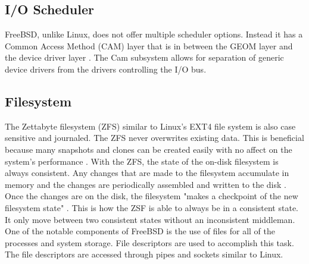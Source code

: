 \subsection{I/O Scheduler}
FreeBSD, unlike Linux, does not offer multiple scheduler options. Instead it has a Common Access Method (CAM) layer that is in between the GEOM layer and the device driver layer \cite{Freebsdtext}. The Cam subsystem allows for separation of generic device drivers from the drivers controlling the I/O bus.

\subsection{Filesystem}
The Zettabyte filesystem (ZFS) similar to Linux's EXT4 file system is also case sensitive and journaled. The ZFS never overwrites existing data. This is beneficial because many snapshots and clones can be created easily with no affect on the system's performance \cite{Freebsdtext}. With the ZFS, the state of the on-disk filesystem is always consistent. Any changes that are made to the filesystem accumulate in memory and the changes are periodically assembled and written to the disk \cite{Freebsdtext}. Once the changes are on the disk, the filesystem "makes a checkpoint of the new filesystem state" \cite{Freebsdtext}. This is how the ZSF is able to always be in a consistent state. It only move between two consistent states without an inconsistent middleman. One of the notable components of FreeBSD is the use of files for all of the processes and system storage. File descriptors are used to accomplish this task. The file descriptors are accessed through pipes and sockets similar to Linux\cite{Freebsdtext}.  


